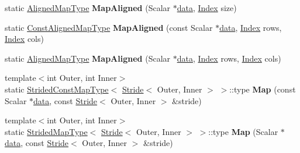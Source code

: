 \begin{Indent}
\begin{DoxyCompactItemize}
static \hyperlink{group___core___module_class_eigen_1_1_map}{Aligned\+Map\+Type} {\bfseries Map\+Aligned} (Scalar $\ast$\hyperlink{class_eigen_1_1_plain_object_base_ac25699535374b1854cf8494e44ad31b2}{data}, \hyperlink{namespace_eigen_a62e77e0933482dafde8fe197d9a2cfde}{Index} size)
\item 
\mbox{\label{class_eigen_1_1_plain_object_base_a8b161ab58c8370b97ac8131efb6964dc}} 
static \hyperlink{group___core___module_class_eigen_1_1_map}{Const\+Aligned\+Map\+Type} {\bfseries Map\+Aligned} (const Scalar $\ast$\hyperlink{class_eigen_1_1_plain_object_base_ac25699535374b1854cf8494e44ad31b2}{data}, \hyperlink{namespace_eigen_a62e77e0933482dafde8fe197d9a2cfde}{Index} rows, \hyperlink{namespace_eigen_a62e77e0933482dafde8fe197d9a2cfde}{Index} cols)
\item 
\mbox{\label{class_eigen_1_1_plain_object_base_a98a4e03be918eb01bd7719d260debe1a}} 
static \hyperlink{group___core___module_class_eigen_1_1_map}{Aligned\+Map\+Type} {\bfseries Map\+Aligned} (Scalar $\ast$\hyperlink{class_eigen_1_1_plain_object_base_ac25699535374b1854cf8494e44ad31b2}{data}, \hyperlink{namespace_eigen_a62e77e0933482dafde8fe197d9a2cfde}{Index} rows, \hyperlink{namespace_eigen_a62e77e0933482dafde8fe197d9a2cfde}{Index} cols)
\item 
\mbox{\label{class_eigen_1_1_plain_object_base_a8ed320f4d926ab401117564cafc3e232}} 
{\footnotesize template$<$int Outer, int Inner$>$ }\\static \hyperlink{struct_eigen_1_1_plain_object_base_1_1_strided_const_map_type}{Strided\+Const\+Map\+Type}$<$ \hyperlink{group___core___module_class_eigen_1_1_stride}{Stride}$<$ Outer, Inner $>$ $>$\+::type {\bfseries Map} (const Scalar $\ast$\hyperlink{class_eigen_1_1_plain_object_base_ac25699535374b1854cf8494e44ad31b2}{data}, const \hyperlink{group___core___module_class_eigen_1_1_stride}{Stride}$<$ Outer, Inner $>$ \&stride)
\item 
\mbox{\label{class_eigen_1_1_plain_object_base_a240ab54b8839d02bdd35e358a3d66b73}} 
{\footnotesize template$<$int Outer, int Inner$>$ }\\static \hyperlink{struct_eigen_1_1_plain_object_base_1_1_strided_map_type}{Strided\+Map\+Type}$<$ \hyperlink{group___core___module_class_eigen_1_1_stride}{Stride}$<$ Outer, Inner $>$ $>$\+::type {\bfseries Map} (Scalar $\ast$\hyperlink{class_eigen_1_1_plain_object_base_ac25699535374b1854cf8494e44ad31b2}{data}, const \hyperlink{group___core___module_class_eigen_1_1_stride}{Stride}$<$ Outer, Inner $>$ \&stride)

\end{DoxyCompactItemize}
\end{Indent}
